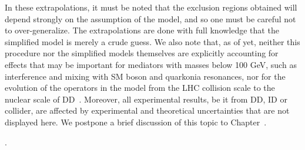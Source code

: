 In these extrapolations, it must be noted that the exclusion regions obtained will depend strongly on the assumption of the model, and so one must be careful not to over-generalize.
The extrapolations are done with full knowledge that the simplified model is merely a crude guess.
We also note that, as of yet, neither this procedure nor the simplified models themselves are explicitly accounting for effects that may be important for mediators with masses below 100 GeV, such as interference and mixing with SM boson and quarkonia resonances, nor for the evolution of the operators in the model from the LHC collision scale to the nuclear scale of DD~\cite{DEramo:2014nmf}.
Moreover, all experimental results, be it from DD, ID or collider, are affected by experimental and theoretical uncertainties that are not displayed here.
We postpone a brief discussion of this topic to Chapter~\cite{sec:05_Future}.






. 







